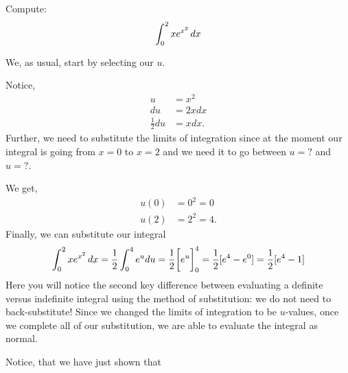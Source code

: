 \documentclass{ximera}
\begin{document}
\begin{example}
Compute:
\[
\int_0^2 x e^{x^2}\mathop{}\!d x
\]
\begin{explanation}
We, as usual, start by selecting our $u$.

Notice,
\begin{align*}
u&=x^2\\
du&=2xdx\\
\frac{1}{2}du&=xdx.
\end{align*}
Further, we need to substitute the limits of integration since at the moment our integral is going from $x=0$ to $x=2$ and we need it to go between $u=?$ and $u=?$.

We get,
\begin{align*}
u(0) &= 0^2 = 0  \\
u(2) &=2^2 = 4.
\end{align*}
Finally, we can substitute our integral
\[
\int_0^2 x e^{x^2}\mathop{}\!d x
=\frac{1}{2}\int_0^{4} e^{u} du=\frac{1}{2}\bigg[ e^u \bigg]_0^4=\frac{1}{2}[e^4-e^0]=\frac{1}{2}[e^4-1]\]
Here you will notice the second key difference between evaluating a definite versus indefinite integral using the method of substitution: we do not need to back-substitute! Since we changed the limits of integration to be $u$-values, once we complete all of our substitution, we are able to evaluate the integral as normal. 


Notice, that we have just shown that


\end{explanation}
\end{example}
\end{document}
